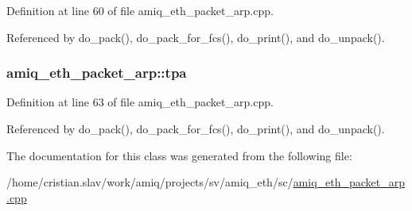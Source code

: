 Definition at line 60 of file amiq\_\-eth\_\-packet\_\-arp.cpp.

Referenced by do\_\-pack(), do\_\-pack\_\-for\_\-fcs(), do\_\-print(), and do\_\-unpack().\hypertarget{classamiq__eth__packet__arp_a5bb380a2871707d3aabe84617951fde3}{
\subsubsection[{tpa}]{ {\bf amiq\_\-eth\_\-packet\_\-arp::tpa}}}
\label{classamiq__eth__packet__arp_a5bb380a2871707d3aabe84617951fde3}


Definition at line 63 of file amiq\_\-eth\_\-packet\_\-arp.cpp.

Referenced by do\_\-pack(), do\_\-pack\_\-for\_\-fcs(), do\_\-print(), and do\_\-unpack().

The documentation for this class was generated from the following file:\begin{DoxyCompactItemize}
\item 
/home/cristian.slav/work/amiq/projects/sv/amiq\_\-eth/sc/\hyperlink{amiq__eth__packet__arp_8cpp}{amiq\_\-eth\_\-packet\_\-arp.cpp}\end{DoxyCompactItemize}
